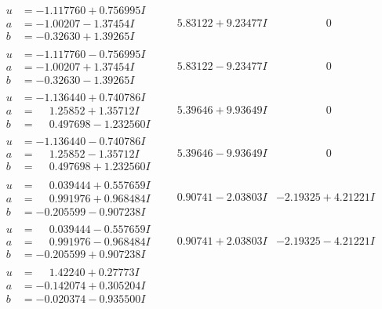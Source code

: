 \documentclass[1p]{elsarticle_modified}
\theoremstyle{definition}
\begin{document}
$$\begin{array}{c|c|c}
\begin{aligned}
u &= -1.117760 + 0.756995 I \\
a &= -1.00207 - 1.37454 I \\
b &= -0.32630 + 1.39265 I\end{aligned}
 & \phantom{-}5.83122 + 9.23477 I & \phantom{-0.000000 } 0 \\ \hline\begin{aligned}
u &= -1.117760 - 0.756995 I \\
a &= -1.00207 + 1.37454 I \\
b &= -0.32630 - 1.39265 I\end{aligned}
 & \phantom{-}5.83122 - 9.23477 I & \phantom{-0.000000 } 0 \\ \hline\begin{aligned}
u &= -1.136440 + 0.740786 I \\
a &= \phantom{-}1.25852 + 1.35712 I \\
b &= \phantom{-}0.497698 - 1.232560 I\end{aligned}
 & \phantom{-}5.39646 + 9.93649 I & \phantom{-0.000000 } 0 \\ \hline\begin{aligned}
u &= -1.136440 - 0.740786 I \\
a &= \phantom{-}1.25852 - 1.35712 I \\
b &= \phantom{-}0.497698 + 1.232560 I\end{aligned}
 & \phantom{-}5.39646 - 9.93649 I & \phantom{-0.000000 } 0 \\ \hline\begin{aligned}
u &= \phantom{-}0.039444 + 0.557659 I \\
a &= \phantom{-}0.991976 + 0.968484 I \\
b &= -0.205599 - 0.907238 I\end{aligned}
 & \phantom{-}0.90741 - 2.03803 I & -2.19325 + 4.21221 I \\ \hline\begin{aligned}
u &= \phantom{-}0.039444 - 0.557659 I \\
a &= \phantom{-}0.991976 - 0.968484 I \\
b &= -0.205599 + 0.907238 I\end{aligned}
 & \phantom{-}0.90741 + 2.03803 I & -2.19325 - 4.21221 I \\ \hline\begin{aligned}
u &= \phantom{-}1.42240 + 0.27773 I \\
a &= -0.142074 + 0.305204 I \\
b &= -0.020374 - 0.935500 I\end{aligned}

\end{array}$$
\end{document}
